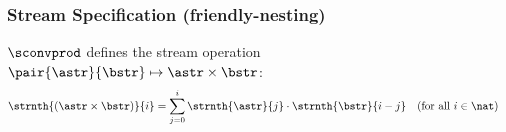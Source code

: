 \documentclass[10pt]{beamer}
\begin{document}
\begin{frame}%
  \frametitle{Stream Specification (friendly-nesting)}
  
\newcommand{\myvspace}{\rule{0pt}{2.2ex}}  
\renewcommand{\arraystretch}{1.25}
\begin{example}
  \vspace*{-0.5ex}
\begin{center}  
  \vspace*{-1.5ex}
\end{center}
\end{example}

$\sconvprod$ defines %
the stream operation
$ \pair{\astr}{\bstr} \mapsto \astr\times\bstr $:
%
\begin{align*}
  \strnth{({\astr}\times{\bstr})}{i} 
    & = \sum_{j=0}^i \strnth{\astr}{j}\cdot\strnth{\bstr}{i-j} 
  & & \text{(for all $i\in\nat$)}
\end{align*}

\end{frame}%
\end{document}
